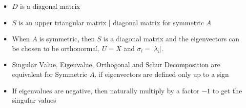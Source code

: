 \begin{itemize}
\item $D$ is a diagonal matrix
\item $S$ is an upper triangular matrix | diagonal matrix for symmetric $A$
\item When $A$ is symmetric, then $S$ is a diagonal matrix and the eigenvectors can be chosen to be orthonormal, $U=X$ and $\sigma_i=\left|\lambda_i\right|$.
\item Singular Value, Eigenvalue, Orthogonal and Schur Decomposition are equivalent for Symmetric $A$, if eigenvectors are defined only up to a sign
\item If eigenvalues are negative, then naturally multiply by a factor  $-1$ to get the singular values
\end{itemize}